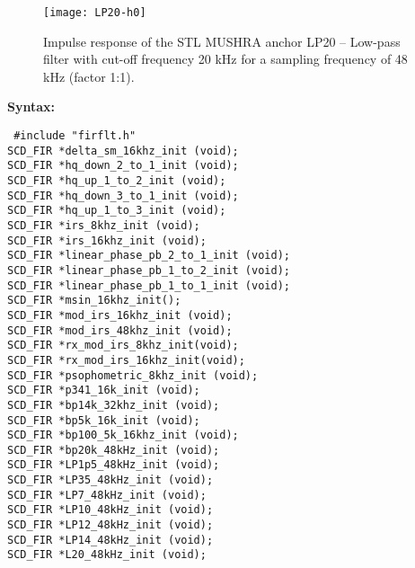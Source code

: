 \begin{figure}[hbtp]
  \begin{center}
 \texttt{[image: LP20-h0]}
  \end{center}
  \caption{\SF Impulse response of the STL MUSHRA anchor LP20 -- Low-pass filter with cut-off frequency 20 kHz for a sampling frequency of 48 kHz (factor 1:1).
           \label{LP20-ir}
          }
\end{figure}
\flushfloats



{\bf Syntax: }

{\tt
\#include "firflt.h"\\
SCD\_FIR *delta\_sm\_16khz\_init (void);\\
SCD\_FIR *hq\_down\_2\_to\_1\_init (void);\\
SCD\_FIR *hq\_up\_1\_to\_2\_init (void);\\
SCD\_FIR *hq\_down\_3\_to\_1\_init (void);\\
SCD\_FIR *hq\_up\_1\_to\_3\_init (void);\\
SCD\_FIR *irs\_8khz\_init (void);\\
SCD\_FIR *irs\_16khz\_init (void);\\
SCD\_FIR *linear\_phase\_pb\_2\_to\_1\_init (void);\\
SCD\_FIR *linear\_phase\_pb\_1\_to\_2\_init (void);\\
SCD\_FIR *linear\_phase\_pb\_1\_to\_1\_init (void);\\
SCD\_FIR *msin\_16khz\_init();\\
SCD\_FIR *mod\_irs\_16khz\_init (void);\\
SCD\_FIR *mod\_irs\_48khz\_init (void);\\
SCD\_FIR *rx\_mod\_irs\_8khz\_init(void);\\
SCD\_FIR *rx\_mod\_irs\_16khz\_init(void);\\
SCD\_FIR *psophometric\_8khz\_init (void);\\
SCD\_FIR *p341\_16k\_init (void);\\
SCD\_FIR *bp14k\_32khz\_init (void);\\
SCD\_FIR *bp5k\_16k\_init (void);\\
SCD\_FIR *bp100\_5k\_16khz\_init (void);\\
SCD\_FIR *bp20k\_48kHz\_init (void);\\
SCD\_FIR *LP1p5\_48kHz\_init (void);\\
SCD\_FIR *LP35\_48kHz\_init (void);\\
SCD\_FIR *LP7\_48kHz\_init (void);\\
SCD\_FIR *LP10\_48kHz\_init (void);\\
SCD\_FIR *LP12\_48kHz\_init (void);\\
SCD\_FIR *LP14\_48kHz\_init (void);\\
SCD\_FIR *L20\_48kHz\_init (void);\\
}


